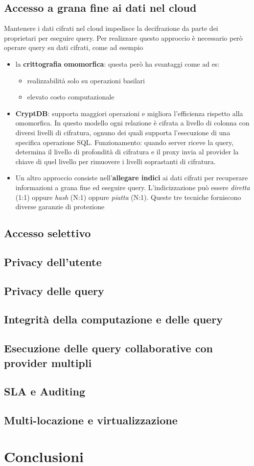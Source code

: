 \subsection{Accesso a grana fine ai dati nel cloud}
Mantenere i dati cifrati nel cloud impedisce la decifrazione da parte dei proprietari per eseguire query. Per realizzare questo approccio è necessario però operare query su dati cifrati, come ad esempio
\begin{itemize}
    \item la \textbf{crittografia omomorfica}: questa però ha svantaggi come ad es:
        \begin{itemize}
            \item realizzabilità solo su operazioni basilari
            \item elevato costo computazionale
        \end{itemize}
    \item \textbf{CryptDB}: supporta maggiori operazioni e migliora l'efficienza rispetto alla omomorfica. In questo modello ogni relazione è cifrata a livello di colonna con diversi livelli di cifratura, ognuno dei quali supporta l'esecuzione di una specifica operazione SQL.
    Funzionamento: quando server riceve la query, determina il livello di profondità di cifratura e il proxy invia al provider la chiave di quel livello per rimuovere i livelli soprastanti di cifratura.
    \item Un altro approccio consiste nell'\textbf{allegare indici} ai dati cifrati per recuperare informazioni a grana fine ed eseguire query. L'indicizzazione può essere \textit{diretta} (1:1) oppure \textit{hash} (N:1) oppure \textit{piatta} (N:1). Queste tre tecniche forniscono diverse garanzie di protezione
\end{itemize}

\subsection{Accesso selettivo}
\subsection{Privacy dell'utente}
\subsection{Privacy delle query}
\subsection{Integrità della computazione e delle query}
\subsection{Esecuzione delle query collaborative con provider multipli}
\subsection{SLA e Auditing}
\subsection{Multi-locazione e virtualizzazione}
\section{Conclusioni}